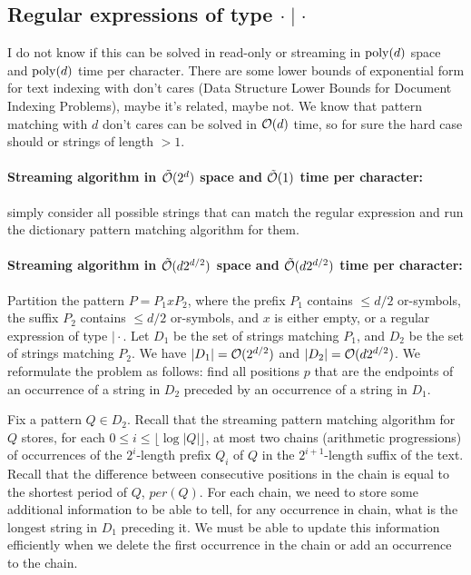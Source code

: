 \documentclass{article}
\begin{document}

\subsection{Regular expressions of type $\cdot \mid \cdot$}
I do not know if this can be solved in read-only or streaming in $\mathrm{poly}(d)$ space and $\mathrm{poly}(d)$ time per character. There are some lower bounds of exponential form for text indexing with don't cares (Data Structure Lower Bounds for Document Indexing Problems), maybe it's related, maybe not. We know that pattern matching with $d$ don't cares can be solved in $\mathcal{O}(d)$ time, so for sure the hard case should or strings of length $> 1$.

\paragraph{Streaming algorithm in $\tilde{\mathcal{O}}(2^{d})$ space and $\tilde{\mathcal{O}}(1)$ time per character:} simply consider all possible strings that can match the regular expression and run the dictionary pattern matching algorithm for them. 

\paragraph{Streaming algorithm in $\tilde{\mathcal{O}}(d 2^{d/2})$ space and $\tilde{\mathcal{O}}(d 2^{d/2})$ time per character:} Partition the pattern $P = P_1 x P_2$, where the prefix $P_1$ contains $\le d/2$ or-symbols, the suffix $P_2$ contains $\le d/2$ or-symbols, and $x$ is either empty, or a regular expression of type $\mid \cdot$. Let $D_1$ be the set of strings matching $P_1$, and $D_2$ be the set of strings matching $P_2$. We have $|D_1| = \mathcal{O}(2^{d/2})$ and $|D_2| = \mathcal{O}(d 2^{d/2})$. We reformulate the problem as follows: find all positions $p$ that are the endpoints of an occurrence of a string in $D_2$ preceded by an occurrence of a string in $D_1$. 

Fix a pattern $Q \in D_2$. 
Recall that the streaming pattern matching algorithm for $Q$ stores, for each $0 \le i \le \lfloor \log |Q| \rfloor$, at most two chains (arithmetic progressions) of occurrences of the $2^i$-length prefix $Q_i$ of $Q$ in the $2^{i+1}$-length suffix of the text. Recall that the difference between consecutive positions in the chain is equal to the shortest period of $Q$, $per(Q)$. For each chain, we need to store some additional information to be able to tell, for any occurrence in chain, what is the longest string in $D_1$ preceding it.  We must be able to update this information efficiently when we delete the first occurrence in the chain or add an occurrence to the chain.
\end{document}
